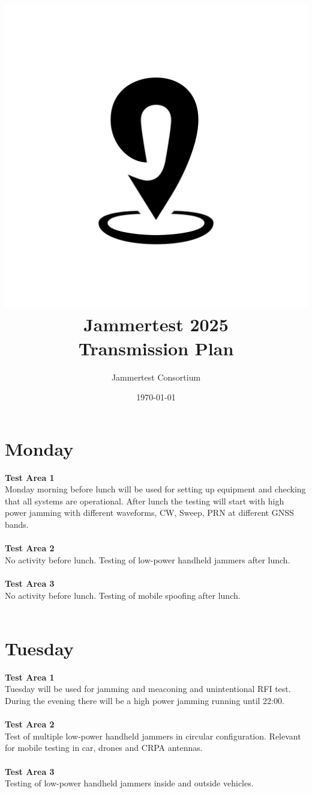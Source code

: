 \documentclass[a4paper]{book}
\title{\includegraphics[scale=0.2]{graphics/jampin.png}\\ Jammertest 2025 \\ \huge{Transmission Plan}}
\author{Jammertest Consortium}
\date{\today \\ \DTMcurrenttime}
\begin{document}
\maketitle

\tableofcontents
\restoregeometry

\begin{landscape}

\chapter{Monday}
\Large \textbf{Test Area 1} \\
Monday morning before lunch will be used for setting up equipment and checking that all systems are operational. After lunch the testing will start with high power jamming with different waveforms, CW, Sweep, PRN at different GNSS bands.\\ \\
\Large \textbf{Test Area 2} \\
No activity before lunch. Testing of low-power handheld jammers after lunch.\\ \\
\Large \textbf{Test Area 3} \\
No activity before lunch. Testing of mobile spoofing after lunch.\\ \\

%

\chapter{Tuesday}
\Large \textbf{Test Area 1} \\
Tuesday will be used for jamming and meaconing and unintentional RFI test. During the evening there will be a high power jamming running until 22:00.\\ \\
\Large \textbf{Test Area 2} \\ 
Test of multiple low-power handheld jammers in circular configuration. Relevant for mobile testing in car, drones and CRPA antennas.\\ \\ 
\Large \textbf{Test Area 3} \\
Testing of low-power handheld jammers inside and outside vehicles.\\ \\

%


\end{landscape}
\end{document}
